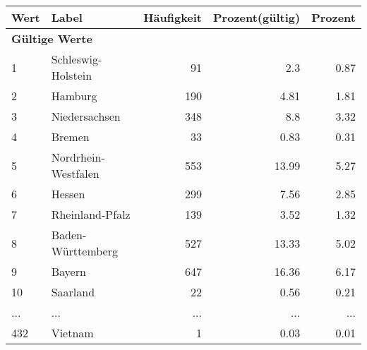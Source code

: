      \begin{longtable}{lXrrr}
     \toprule
     \textbf{Wert} & \textbf{Label} & \textbf{Häufigkeit} & \textbf{Prozent(gültig)} & \textbf{Prozent} \\
     \endhead
     \midrule
     \multicolumn{5}{l}{\textbf{Gültige Werte}}\\
        1 & \multicolumn{1}{X}{Schleswig-Holstein} & %
          \num{91} &
          \num[round-mode=places,round-precision=2]{2,3} &
          \num[round-mode=places,round-precision=2]{0,87} \\
        2 & \multicolumn{1}{X}{Hamburg} & %
          \num{190} &
          \num[round-mode=places,round-precision=2]{4,81} &
          \num[round-mode=places,round-precision=2]{1,81} \\
        3 & \multicolumn{1}{X}{Niedersachsen} & %
          \num{348} &
          \num[round-mode=places,round-precision=2]{8,8} &
          \num[round-mode=places,round-precision=2]{3,32} \\
        4 & \multicolumn{1}{X}{Bremen} & %
          \num{33} &
          \num[round-mode=places,round-precision=2]{0,83} &
          \num[round-mode=places,round-precision=2]{0,31} \\
        5 & \multicolumn{1}{X}{Nordrhein-Westfalen} & %
          \num{553} &
          \num[round-mode=places,round-precision=2]{13,99} &
          \num[round-mode=places,round-precision=2]{5,27} \\
        6 & \multicolumn{1}{X}{Hessen} & %
          \num{299} &
          \num[round-mode=places,round-precision=2]{7,56} &
          \num[round-mode=places,round-precision=2]{2,85} \\
        7 & \multicolumn{1}{X}{Rheinland-Pfalz} & %
          \num{139} &
          \num[round-mode=places,round-precision=2]{3,52} &
          \num[round-mode=places,round-precision=2]{1,32} \\
        8 & \multicolumn{1}{X}{Baden-Württemberg} & %
          \num{527} &
          \num[round-mode=places,round-precision=2]{13,33} &
          \num[round-mode=places,round-precision=2]{5,02} \\
        9 & \multicolumn{1}{X}{Bayern} & %
          \num{647} &
          \num[round-mode=places,round-precision=2]{16,36} &
          \num[round-mode=places,round-precision=2]{6,17} \\
        10 & \multicolumn{1}{X}{Saarland} & %
          \num{22} &
          \num[round-mode=places,round-precision=2]{0,56} &
          \num[round-mode=places,round-precision=2]{0,21} \\
       ... & ... & ... & ... & ... \\
        432 & \multicolumn{1}{X}{Vietnam} & %
          \num{1} &
          \num[round-mode=places,round-precision=2]{0,03} &
          \num[round-mode=places,round-precision=2]{0,01} \\


\end{longtable}
